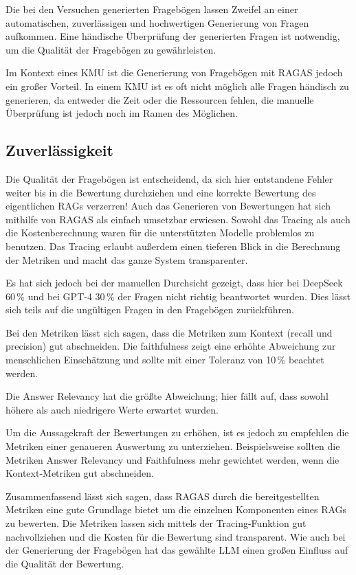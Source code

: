 Die bei den Versuchen generierten Fragebögen lassen Zweifel an einer automatischen, zuverlässigen und hochwertigen Generierung von Fragen aufkommen.
Eine händische Überprüfung der generierten Fragen ist notwendig, um die Qualität der Fragebögen zu gewährleisten.

Im Kontext eines KMU ist die Generierung von Fragebögen mit RAGAS jedoch ein großer Vorteil.
In einem KMU ist es oft nicht möglich alle Fragen händisch zu generieren, da entweder die Zeit oder die Ressourcen fehlen, die manuelle Überprüfung ist jedoch noch im Ramen des Möglichen.

\subsection{Zuverlässigkeit}

Die Qualität der Fragebögen ist entscheidend, da sich hier entstandene Fehler weiter bis in die Bewertung durchziehen und eine korrekte Bewertung des eigentlichen RAGs verzerren!
Auch das Generieren von Bewertungen hat sich mithilfe von RAGAS als einfach umsetzbar erwiesen.
Sowohl das Tracing als auch die Kostenberechnung waren für die unterstützten Modelle problemlos zu benutzen.
Das Tracing erlaubt außerdem einen tieferen Blick in die Berechnung der Metriken und macht das ganze System transparenter.

Es hat sich jedoch bei der manuellen Durchsicht gezeigt, dass hier bei DeepSeek 60\,\% und bei GPT-4 30\,\% der Fragen nicht richtig beantwortet wurden.
Dies lässt sich teils auf die ungültigen Fragen in den Fragebögen zurückführen.

Bei den Metriken lässt sich sagen, dass die Metriken zum Kontext (recall und precision) gut abschneiden.
Die faithfulness zeigt eine erhöhte Abweichung zur menschlichen Einschätzung und sollte mit einer Toleranz von 10\,\% beachtet werden.

Die Answer Relevancy hat die größte Abweichung; hier fällt auf, dass sowohl höhere als auch niedrigere Werte erwartet wurden.

Um die Aussagekraft der Bewertungen zu erhöhen, ist es jedoch zu empfehlen die Metriken einer genaueren Auswertung zu unterziehen.
Beispielsweise sollten die Metriken Answer Relevancy und Faithfulness mehr gewichtet werden, wenn die Kontext-Metriken gut abschneiden.

Zusammenfassend lässt sich sagen, dass RAGAS durch die bereitgestellten Metriken eine gute Grundlage bietet um die einzelnen Komponenten eines RAGs zu bewerten.
Die Metriken lassen sich mittels der Tracing-Funktion gut nachvollziehen und die Kosten für die Bewertung sind transparent.
Wie auch bei der Generierung der Fragebögen hat das gewählte LLM einen großen Einfluss auf die Qualität der Bewertung.

